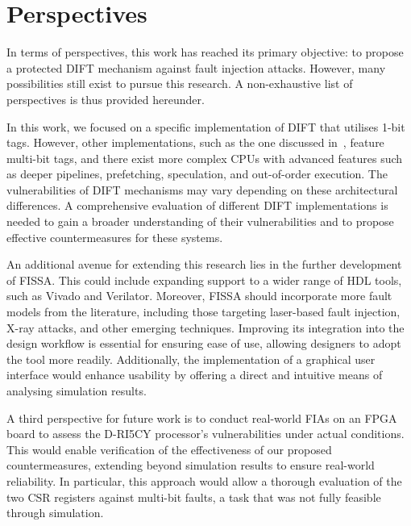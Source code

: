 \section{Perspectives}

In terms of perspectives, this work has reached its primary objective: to propose a protected DIFT mechanism against fault injection attacks. However, many possibilities still exist to pursue this research. A non-exhaustive list of perspectives is thus provided hereunder.

In this work, we focused on a specific implementation of DIFT that utilises 1-bit tags. However, other implementations, such as the one discussed in~\cite{DKK-07-sigarch}, feature multi-bit tags, and there exist more complex CPUs with advanced features such as deeper pipelines, prefetching, speculation, and out-of-order execution. The vulnerabilities of DIFT mechanisms may vary depending on these architectural differences. A comprehensive evaluation of different DIFT implementations is needed to gain a broader understanding of their vulnerabilities and to propose effective countermeasures for these systems.

An additional avenue for extending this research lies in the further development of FISSA. This could include expanding support to a wider range of HDL tools, such as Vivado and Verilator. Moreover, FISSA should incorporate more fault models from the literature, including those targeting laser-based fault injection, X-ray attacks, and other emerging techniques. Improving its integration into the design workflow is essential for ensuring ease of use, allowing designers to adopt the tool more readily. Additionally, the implementation of a graphical user interface would enhance usability by offering a direct and intuitive means of analysing simulation results.

A third perspective for future work is to conduct real-world FIAs on an FPGA board to assess the D-RI5CY processor’s vulnerabilities under actual conditions. This would enable verification of the effectiveness of our proposed countermeasures, extending beyond simulation results to ensure real-world reliability. In particular, this approach would allow a thorough evaluation of the two CSR registers against multi-bit faults, a task that was not fully feasible through simulation.

